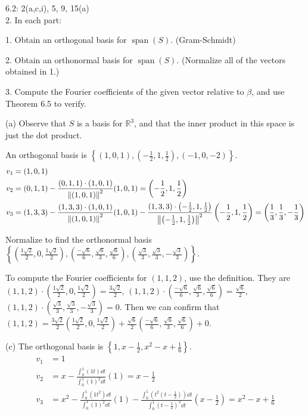 \documentclass[11pt]{article}
\newcommand{\br}[1]{\left(#1\right)}
\newcommand{\cbr}[1]{\left\{#1\right\}}
\DeclareMathOperator{\Span}{span}
\begin{document}
6.2: 2(a,c,i),  5, 9, 15(a) \\

2. In each part:

\hspace{1cm}1. Obtain an orthogonal basis for $\Span(S)$. (Gram-Schmidt)

\hspace{1cm}2. Obtain an orthonormal basis for $\Span(S)$. (Normalize all of the vectors obtained in 1.)

\hspace{1cm}3. Compute the Fourier coefficients of the given vector relative to $\beta$, and use Theorem 6.5 to verify.

(a) Observe that $S$ is a basis for $\mathbb{R}^3$, and that the inner product in this space is just the dot product.


An orthogonal basis is $\boxed{\cbr{(1,0,1), \br{-\frac{1}{2}, 1, \frac{1}{2}} , \br{-1,0,-2}}}$. \begin{align*}
  v_1 &= (1,0,1) \\
  v_2 &= (0,1,1) - \frac{(0,1,1)\cdot(1,0,1)}{\norm{(1,0,1)}^2}(1,0,1) = \br{-\frac{1}{2}, 1, \frac{1}{2}} \\
  v_3 &= (1,3,3) - \frac{(1,3,3)\cdot(1,0,1)}{\norm{(1,0,1)}^2}(1,0,1) - \frac{(1,3,3)\cdot\br{-\frac{1}{2}, 1, \frac{1}{2}}}{\norm{\br{-\frac{1}{2}, 1, \frac{1}{2}}}^2}\br{-\frac{1}{2}, 1, \frac{1}{2}} = \br{\frac{1}{3}, \frac{1}{3}, -\frac{1}{3}}
\end{align*}

Normalize to find the orthonormal basis $\boxed{\cbr{\br{\frac{1\sqrt{2}}{2}, 0, \frac{1\sqrt{2}}{2}},\br{\frac{-\sqrt{6}}{6}, \frac{\sqrt{6}}{3}, \frac{\sqrt{6}}{6}},\br{\frac{\sqrt{3}}{3}, \frac{\sqrt{3}}{3}, -\frac{\sqrt{3}}{3}}}}$.

To compute the Fourier coefficients for $(1,1,2)$, use the definition. They are $(1,1,2)\cdot\br{\frac{1\sqrt{2}}{2}, 0, \frac{1\sqrt{2}}{2}} = \frac{3\sqrt{2}}{2}$, $(1,1,2)\cdot \br{\frac{-\sqrt{6}}{6}, \frac{\sqrt{6}}{3}, \frac{\sqrt{6}}{6}}= \frac{\sqrt{6}}{2}$, $(1,1,2)\cdot\br{\frac{\sqrt{3}}{3}, \frac{\sqrt{3}}{3}, -\frac{\sqrt{3}}{3}} = 0$. Then we can confirm that $(1,1,2) = \frac{3\sqrt{2}}{2}\br{\frac{1\sqrt{2}}{2}, 0, \frac{1\sqrt{2}}{2}} + \frac{\sqrt{6}}{2}\br{\frac{-\sqrt{6}}{6}, \frac{\sqrt{6}}{3}, \frac{\sqrt{6}}{6}} + 0$.

(c) The orthogonal basis is $\boxed{\cbr{1, x-\frac{1}{2}, x^2-x+\frac{1}{6}}}$. \begin{align*}
  v_1 &= 1 \\
  v_2 &= x - \frac{\int_0^1 \br{1t}\dd{t}}{\int_0^1 \br{1}^2\dd{t}}(1) = x-\frac{1}{2} \\
  v_3 &= x^2 - \frac{\int_0^1 \br{1t^2}\dd{t}}{\int_0^1\br{1}^2\dd{t}}(1) - \frac{\int_0^1 \br{t^2\br{t-\frac{1}{2}}}\dd{t}}{\int_0^1\br{t-\frac{1}{2}}^2\dd{t}}\br{x-\frac{1}{2}} = x^2-x+\frac{1}{6}
\end{align*}
\end{document}
